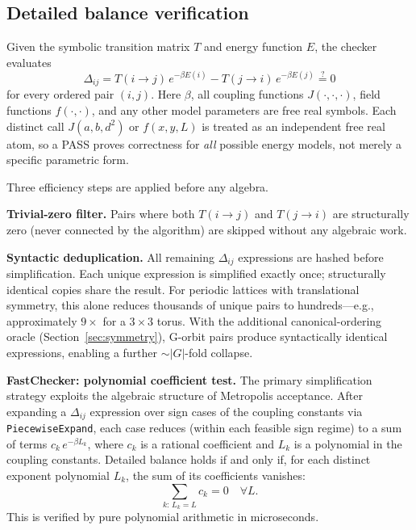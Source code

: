 \documentclass[twocolumn,10pt]{article}
\begin{document}
\subsection{Detailed balance verification}
\label{sec:dbcheck}

Given the symbolic transition matrix $T$ and energy function $E$, the checker
evaluates
\begin{equation}
  \Delta_{ij} = T(i{\to}j)\,e^{-\beta E(i)} - T(j{\to}i)\,e^{-\beta E(j)}
  \stackrel{?}{=} 0
  \label{eq:check}
\end{equation}
for every ordered pair $(i,j)$.  Here $\beta$, all coupling functions
$J(\cdot,\cdot,\cdot)$, field functions $f(\cdot,\cdot)$, and any other model
parameters are free real symbols.  Each distinct call $J(a,b,d^2)$ or
$f(x,y,L)$ is treated as an independent free real atom, so a PASS proves
correctness for \emph{all} possible energy models, not merely a specific
parametric form.

Three efficiency steps are applied before any algebra.

\medskip\noindent\textbf{Trivial-zero filter.}
Pairs where both $T(i\to j)$ and $T(j\to i)$ are structurally zero (never
connected by the algorithm) are skipped without any algebraic work.

\medskip\noindent\textbf{Syntactic deduplication.}
All remaining $\Delta_{ij}$ expressions are hashed before simplification.
Each unique expression is simplified exactly once; structurally identical
copies share the result.  For periodic lattices with translational symmetry,
this alone reduces thousands of unique pairs to hundreds---e.g.,
approximately $9\times$ for a $3\times 3$ torus.  With the additional
canonical-ordering oracle (Section~\ref{sec:symmetry}), G-orbit pairs
produce syntactically identical expressions, enabling a further
$\sim\!|G|$-fold collapse.

\medskip\noindent\textbf{FastChecker: polynomial coefficient test.}
The primary simplification strategy exploits the algebraic structure of
Metropolis acceptance.  After expanding a $\Delta_{ij}$ expression over sign
cases of the coupling constants via \texttt{PiecewiseExpand}, each
case reduces (within each feasible sign regime) to a sum of terms
$c_k\,e^{-\beta L_k}$, where $c_k$ is a rational coefficient and $L_k$ is a
polynomial in the coupling constants.  Detailed balance holds if and only if,
for each distinct exponent polynomial $L_k$, the sum of its coefficients
vanishes:
\begin{equation}
  \sum_{k:\,L_k = L} c_k = 0 \quad \forall L.
  \label{eq:fast}
\end{equation}
This is verified by pure polynomial arithmetic in microseconds.
\end{document}
